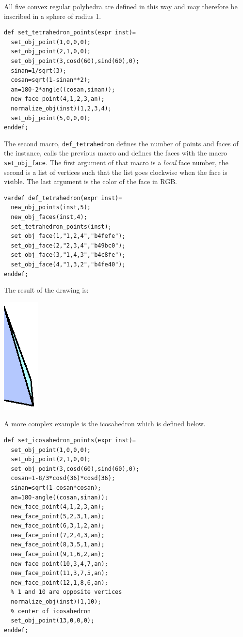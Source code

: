 \documentclass[nonumber,harvardcite]{ltugboat}
\begin{document}
All five convex regular polyhedra are defined in this way and may
therefore be inscribed in a sphere of radius 1.

\begin{verbatim}
def set_tetrahedron_points(expr inst)=
  set_obj_point(1,0,0,0);
  set_obj_point(2,1,0,0);
  set_obj_point(3,cosd(60),sind(60),0);
  sinan=1/sqrt(3);
  cosan=sqrt(1-sinan**2);
  an=180-2*angle((cosan,sinan));
  new_face_point(4,1,2,3,an);
  normalize_obj(inst)(1,2,3,4);
  set_obj_point(5,0,0,0);
enddef;
\end{verbatim}

The second macro, \verb|def_tetrahedron| defines the number of points and
faces of the instance, calls the previous macro and defines the faces
with the macro \verb|set_obj_face|. 
The first argument of that macro is a \emph{local}
face number, the second is a list of vertices such that the list goes clockwise
when the face is visible. The last argument is the color of the face in RGB.

\begin{verbatim}
vardef def_tetrahedron(expr inst)=
  new_obj_points(inst,5);
  new_obj_faces(inst,4);
  set_tetrahedron_points(inst);
  set_obj_face(1,"1,2,4","b4fefe");
  set_obj_face(2,"2,3,4","b49bc0");
  set_obj_face(3,"1,4,3","b4c8fe");
  set_obj_face(4,"1,3,2","b4fe40");
enddef;
\end{verbatim}

The result of the drawing is:

\begin{center}
\includegraphics{tetra.ps}
\end{center}

A more complex example is the icosahedron which is defined below.

\begin{verbatim}
def set_icosahedron_points(expr inst)=
  set_obj_point(1,0,0,0);
  set_obj_point(2,1,0,0);
  set_obj_point(3,cosd(60),sind(60),0);
  cosan=1-8/3*cosd(36)*cosd(36);
  sinan=sqrt(1-cosan*cosan);
  an=180-angle((cosan,sinan));
  new_face_point(4,1,2,3,an);
  new_face_point(5,2,3,1,an);
  new_face_point(6,3,1,2,an);
  new_face_point(7,2,4,3,an);
  new_face_point(8,3,5,1,an);
  new_face_point(9,1,6,2,an);
  new_face_point(10,3,4,7,an);
  new_face_point(11,3,7,5,an);
  new_face_point(12,1,8,6,an);
  % 1 and 10 are opposite vertices
  normalize_obj(inst)(1,10);
  % center of icosahedron
  set_obj_point(13,0,0,0);
enddef;
\end{verbatim}
\end{document}
